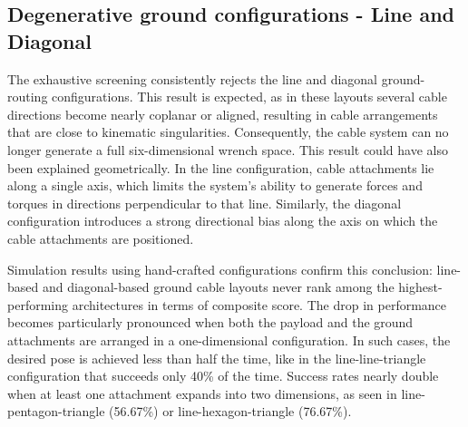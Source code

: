 \subsection{Degenerative ground configurations - Line and Diagonal}
\label{sec:degenerativeConfigurationa}
The exhaustive screening consistently rejects the line and diagonal ground-routing configurations. This result is expected, as in these layouts several cable directions become nearly coplanar or aligned, resulting in cable arrangements that are close to kinematic singularities. Consequently, the cable system can no longer generate a full six-dimensional wrench space. This result could have also been explained geometrically. In the line configuration, cable attachments lie along a single axis, which limits the system's ability to generate forces and torques in directions perpendicular to that line. Similarly, the diagonal configuration introduces a strong directional bias along the axis on which the cable attachments are positioned.

Simulation results using hand-crafted configurations confirm this conclusion: line-based and diagonal-based ground cable layouts never rank among the highest-performing architectures in terms of composite score. The drop in performance becomes particularly pronounced when both the payload and the ground attachments are arranged in a one-dimensional configuration. In such cases, the desired pose is achieved less than half the time, like in the line-line-triangle configuration that succeeds only 40\% of the time. Success rates nearly double when at least one attachment expands into two dimensions, as seen in line-pentagon-triangle (56.67\%) or line-hexagon-triangle (76.67\%).


